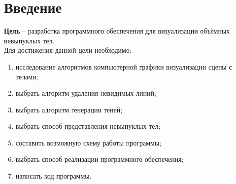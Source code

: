 \chapter*{Введение}
\hspace{1.25cm}
\textbf{ Цель } -- разработка программного обеспечения для визуализации
объёмных невыпуклых тел. \\
\vspace{1cm}
Для достижения данной цели необходимо:
\begin{enumerate}
    \item исследование алгоритмов компьютерной графики визуализации сцены с телами;
    \item выбрать алгоритм удаления невидимых линий;
    \item выбрать алгоритм генерации теней;
    \item выбрать способ представления невыпуклых тел;
    \item составить возможную схему работы программы;
    \item выбрать способ реализации программного обеспечения;
    \item написать код программы.
\end{enumerate}